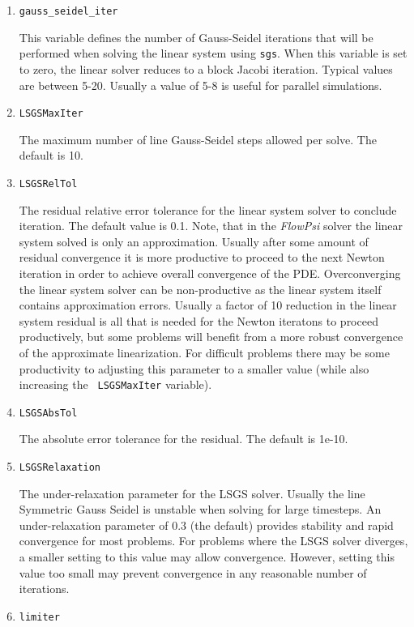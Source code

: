 \documentclass{article}
\begin{document}
\begin{enumerate}
\item {\tt gauss\_seidel\_iter}

  This variable defines the number of Gauss-Seidel iterations that
  will be performed when solving the linear system using {\tt sgs}.
  When this variable is set to zero, the linear solver reduces to a
  block Jacobi iteration.  Typical values are between 5-20.  Usually a
  value of 5-8 is useful for parallel simulations.
\item {\tt LSGSMaxIter} 

  The maximum number of line Gauss-Seidel steps
  allowed per solve. The default is 10.

\item {\tt LSGSRelTol} 

  The residual relative error tolerance for the linear system solver
  to conclude iteration.  The default value is 0.1.  Note, that in the
  {\em FlowPsi} solver the linear system solved is only an approximation.
  Usually after some amount of residual convergence it is more
  productive to proceed to the next Newton iteration in order to
  achieve overall convergence of the PDE.  Overconverging the linear
  system solver can be non-productive as the linear system itself
  contains approximation errors.  Usually a factor of 10 reduction in
  the linear system residual is all that is needed for the Newton
  iteratons to proceed productively, but some problems will benefit
  from a more robust convergence of the approximate linearization.
  For difficult problems there may be some productivity to adjusting
  this parameter to a smaller value (while also increasing the {\tt
    LSGSMaxIter} variable).

\item {\tt LSGSAbsTol}

  The absolute error tolerance for the residual.  The default is 1e-10.

\item {\tt LSGSRelaxation}

  The under-relaxation parameter for the LSGS solver.  Usually the
  line Symmetric Gauss Seidel is unstable when solving for large
  timesteps.  An under-relaxation parameter of 0.3 (the default)
  provides stability and rapid convergence for most problems.  For
  problems where the LSGS solver diverges, a smaller setting to this
  value may allow convergence.  However, setting this value too small
  may prevent convergence in any reasonable number of iterations.

\item {\tt limiter }


\end{enumerate}
\end{document}

